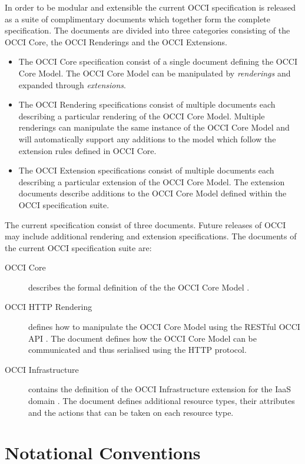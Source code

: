 \documentclass[10pt,a4paper]{article}
\begin{document}
In order to be modular and extensible the current OCCI specification is
released as a suite of complimentary documents which together form the complete
specification.
%
The documents are divided into three categories consisting of the OCCI Core,
the OCCI Renderings and the OCCI Extensions.
%
\begin{itemize}
\item The OCCI Core specification consist of a single document defining the
 OCCI Core Model. The OCCI Core Model can be manipulated by {\em
 renderings} and expanded through {\em extensions}.
\item The OCCI Rendering specifications consist of multiple documents each
 describing a particular rendering of the OCCI Core Model. Multiple renderings can
 manipulate the same instance of the OCCI Core Model and will automatically support
 any additions to the model which follow the extension rules defined in OCCI
 Core.
\item The OCCI Extension specifications consist of multiple documents each
 describing a particular extension of the OCCI Core Model. The extension documents
 describe additions to the OCCI Core Model defined within the OCCI specification
 suite.
\end{itemize}
%
The current specification consist of three documents.
Future releases of OCCI may include additional rendering and extension
specifications. The documents of the current OCCI specification suite are:

\begin{description}
\item[OCCI Core] describes the formal definition of the the OCCI Core Model
\cite{occi:core}.
\item[OCCI HTTP Rendering] defines how to manipulate the OCCI Core Model using the
RESTful OCCI API \cite{occi:http_rendering}. The document defines how the OCCI Core Model can
be communicated and thus serialised using the HTTP protocol.
\item[OCCI Infrastructure] contains the definition of the OCCI Infrastructure
extension for the IaaS domain \cite{occi:infrastructure}. The document defines
additional resource types, their attributes and the actions that can be taken
on each resource type.
\end{description}


\section{Notational Conventions}

\end{document}
